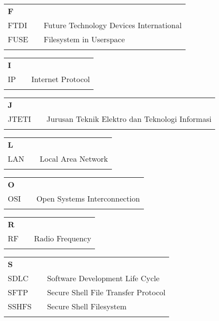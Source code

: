 \documentclass{TMUIITA}
\begin{document}
\begin{tabular}{p{20pt}p{3pt}l}
\textbf{F}\\
FTDI & & Future Technology Devices International\\
FUSE & & Filesystem in Userspace\\
\\
\end{tabular}

\begin{tabular}{p{20pt}p{3pt}l}
\textbf{I}\\
IP & & Internet Protocol\\
\\
\end{tabular}

\begin{tabular}{p{20pt}p{3pt}l}
\textbf{J}\\
JTETI & & Jurusan Teknik Elektro dan Teknologi Informasi\\
\\
\end{tabular}

\begin{tabular}{p{20pt}p{3pt}l}
\textbf{L}\\
LAN & & Local Area Network\\
\\
\end{tabular}

\begin{tabular}{p{20pt}p{3pt}l}
\textbf{O}\\
OSI & & Open Systems Interconnection\\
\\
\end{tabular}

\begin{tabular}{p{20pt}p{3pt}l}
\textbf{R}\\
RF & & Radio Frequency\\
\\
\end{tabular}

\begin{tabular}{p{20pt}p{3pt}l}
\textbf{S}\\
SDLC & & Software Development Life Cycle\\
SFTP & & Secure Shell File Transfer Protocol\\
SSHFS & & Secure Shell Filesystem\\
\\
\end{tabular}
\end{document}
